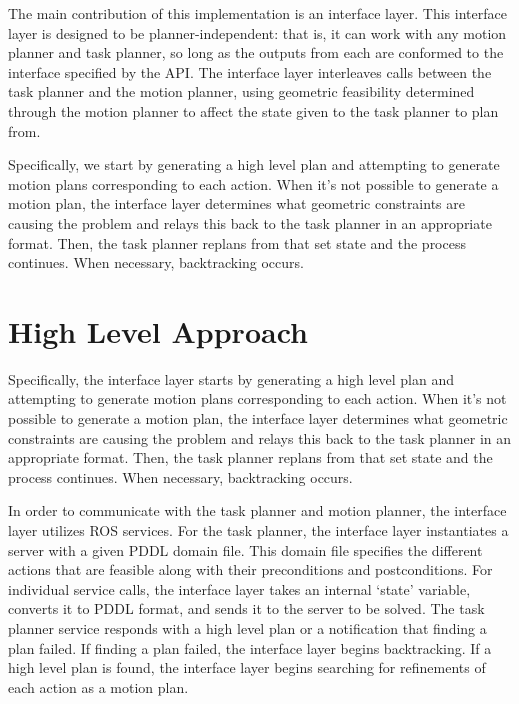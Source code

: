 \documentclass[12pt]{article}
\begin{document}
The main contribution of this implementation is an interface layer.  
This interface layer is designed to be planner-independent: that is, it can work with any motion planner and task planner, so long as the outputs from each are conformed to the interface specified by the API.  
The interface layer interleaves calls between the task planner and the motion planner, using geometric feasibility determined through the motion planner to affect the state given to the task planner to plan from.

Specifically, we start by generating a high level plan and attempting to generate motion plans corresponding to each action.  
When it's not possible to generate a motion plan, the interface layer determines what geometric constraints are causing the problem and relays this back to the task planner in an appropriate format.  
Then, the task planner replans from that set state and the process continues.  
When necessary, backtracking occurs.



\section{High Level Approach}

Specifically, the interface layer starts by generating a high level plan and attempting to generate motion plans corresponding to each action.  
When it's not possible to generate a motion plan, the interface layer determines what geometric constraints are causing the problem and relays this back to the task planner in an appropriate format.  
Then, the task planner replans from that set state and the process continues.  
When necessary, backtracking occurs.

In order to communicate with the task planner and motion planner, the interface layer utilizes ROS services.  
For the task planner, the interface layer instantiates a server with a given PDDL domain file.  
This domain file specifies the different actions that are feasible along with their preconditions and postconditions.  
For individual service calls, the interface layer takes an internal `state' variable, converts it to PDDL format, and sends it to the server to be solved.  
The task planner service responds with a high level plan or a notification that finding a plan failed.  
If finding a plan failed, the interface layer begins backtracking.  
If a high level plan is found, the interface layer begins searching for refinements of each action as a motion plan.
\end{document}
